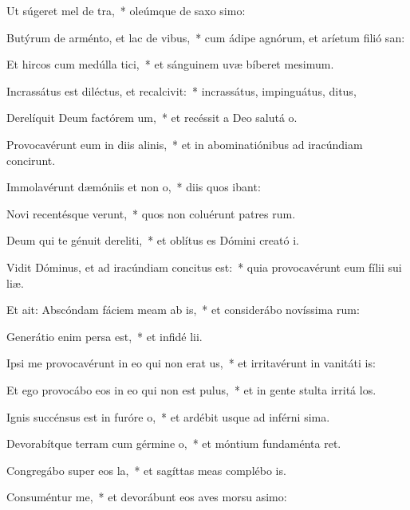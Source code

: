 \item Ut súgeret mel de tra,~* oleúmque de saxo simo:
\item Butýrum de arménto, et lac de vibus,~* cum ádipe agnórum, et aríetum filió san:
\item Et hircos cum medúlla tici,~* et sánguinem uvæ bíberet mesimum.
\item Incrassátus est diléctus, et recalcivit:~* incrassátus, impinguátus, ditus,
\item Derelíquit Deum factórem um,~* et recéssit a Deo salutá o.
\item Provocavérunt eum in diis alinis,~* et in abominatiónibus ad iracúndiam concirunt.
\item Immolavérunt dæmóniis et non o,~* diis quos ibant:
\item Novi recentésque verunt,~* quos non coluérunt patres rum.
\item Deum qui te génuit dereliti,~* et oblítus es Dómini creató i.
\item \singlecolsep
\item Vidit Dóminus, et ad iracúndiam concitus est:~* quia provocavérunt eum fílii sui  liæ.
\item Et ait: Abscóndam fáciem meam ab is,~* et considerábo novíssima rum:
\item Generátio enim persa est,~* et infidé lii.
\item Ipsi me provocavérunt in eo qui non erat us,~* et irritavérunt in vanitáti is:
\item Et ego provocábo eos in eo qui non est pulus,~* et in gente stulta irritá los.
\item Ignis succénsus est in furóre o,~* et ardébit usque ad inférni sima.
\item Devorabítque terram cum gérmine o,~* et móntium fundaménta ret.
\item Congregábo super eos la,~* et sagíttas meas complébo  is.
\item Consuméntur me,~* et devorábunt eos aves morsu asimo:
